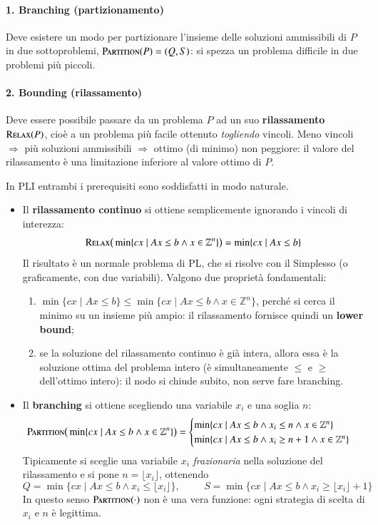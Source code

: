 \documentclass[12pt]{extarticle} %
\begin{document}
\paragraph{1. Branching (partizionamento)}
Deve esistere un modo per partizionare l'insieme delle soluzioni ammissibili di $P$ in due sottoproblemi, $\textsc{Partition}(P) = (Q,S)$: si spezza un problema difficile in due problemi più piccoli.

\paragraph{2. Bounding (rilassamento)}
Deve essere possibile passare da un problema $P$ ad un suo \textbf{rilassamento} $\textsc{Relax}(P)$, cioè a un problema più facile ottenuto \emph{togliendo} vincoli. Meno vincoli $\Rightarrow$ più soluzioni ammissibili $\Rightarrow$ ottimo (di minimo) non peggiore: il valore del rilassamento è una limitazione inferiore al valore ottimo di $P$.

\noindent In PLI entrambi i prerequisiti sono soddisfatti in modo naturale.
\begin{itemize}
    \item Il \textbf{rilassamento continuo} si ottiene semplicemente ignorando i vincoli di interezza:
    \[
    \textsc{Relax}\big(\min\{cx \mid Ax \le b \wedge x \in \mathbb{Z}^n\}\big) = \min\{cx \mid Ax \le b\}
    \]
    Il risultato è un normale problema di PL, che si risolve con il Simplesso (o graficamente, con due variabili). Valgono due proprietà fondamentali:
    \begin{enumerate}
        \item $\min\{cx \mid Ax \le b\} \le \min\{cx \mid Ax \le b \wedge x \in \mathbb{Z}^n\}$, perché si cerca il minimo su un insieme più ampio: il rilassamento fornisce quindi un \textbf{lower bound};
        \item se la soluzione del rilassamento continuo è già intera, allora essa è la soluzione ottima del problema intero (è simultaneamente $\le$ e $\ge$ dell'ottimo intero): il nodo si chiude subito, non serve fare branching.
    \end{enumerate}
    \item Il \textbf{branching} si ottiene scegliendo una variabile $x_i$ e una soglia $n$:
    \[
    \textsc{Partition}\big(\min\{cx \mid Ax \le b \wedge x \in \mathbb{Z}^n\}\big) =
    \begin{cases}
    \min\{cx \mid Ax \le b \wedge x_i \le n \wedge x \in \mathbb{Z}^n\}\\
    \min\{cx \mid Ax \le b \wedge x_i \ge n+1 \wedge x \in \mathbb{Z}^n\}
    \end{cases}
    \]
    Tipicamente si sceglie una variabile $x_i$ \textit{frazionaria} nella soluzione del rilassamento e si pone $n = \lfloor x_i \rfloor$, ottenendo
    \[
    Q = \min\{cx \mid Ax \le b \wedge x_i \le \lfloor x_i \rfloor\}, \hspace{1cm} S = \min\{cx \mid Ax \le b \wedge x_i \ge \lfloor x_i \rfloor + 1\}
    \]
    In questo senso $\textsc{Partition}(\cdot)$ non è una vera funzione: ogni strategia di scelta di $x_i$ e $n$ è legittima.
\end{itemize}
\end{document}
